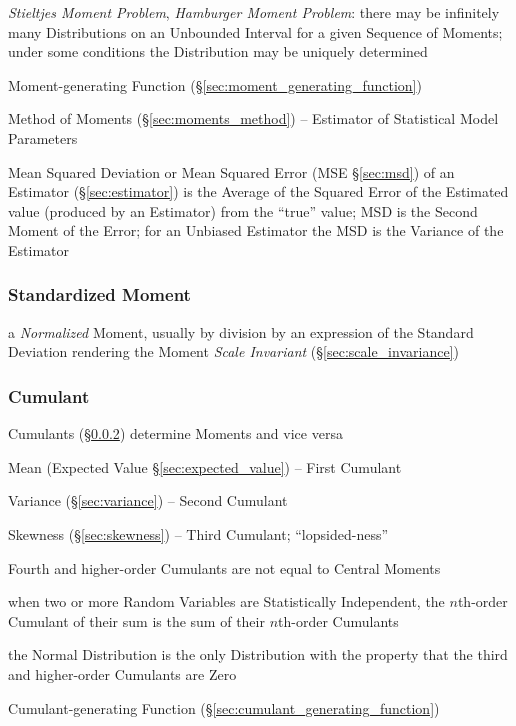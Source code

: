 \emph{Stieltjes Moment Problem}, \emph{Hamburger Moment Problem}: there may be
infinitely many Distributions on an Unbounded Interval for a given Sequence of
Moments; under some conditions the Distribution may be uniquely determined

\fist Moment-generating Function (\S\ref{sec:moment_generating_function})

\fist Method of Moments (\S\ref{sec:moments_method}) -- Estimator of Statistical
Model Parameters

\fist Mean Squared Deviation or Mean Squared Error (MSE \S\ref{sec:msd}) of an
Estimator (\S\ref{sec:estimator}) is the Average of the Squared Error of the
Estimated value (produced by an Estimator) from the ``true'' value; MSD is
the Second Moment of the Error; for an Unbiased Estimator the MSD is the
Variance of the Estimator



\subsubsection{Standardized Moment}\label{sec:standardized_moment}

a \emph{Normalized} Moment, usually by division by an expression of the Standard
Deviation rendering the Moment \emph{Scale Invariant}
(\S\ref{sec:scale_invariance})



\subsubsection{Cumulant}\label{sec:cumulant}

Cumulants (\S\ref{sec:cumulant}) determine Moments and vice versa

Mean (Expected Value \S\ref{sec:expected_value}) -- First Cumulant

Variance (\S\ref{sec:variance}) -- Second Cumulant

Skewness (\S\ref{sec:skewness}) -- Third Cumulant; ``lopsided-ness''

Fourth and higher-order Cumulants are not equal to Central Moments

when two or more Random Variables are Statistically Independent, the $n$th-order
Cumulant of their sum is the sum of their $n$th-order Cumulants

the Normal Distribution is the only Distribution with the property that the
third and higher-order Cumulants are Zero

\fist Cumulant-generating Function (\S\ref{sec:cumulant_generating_function})

